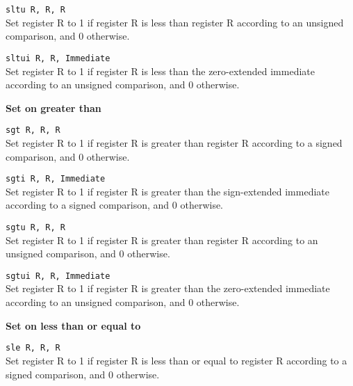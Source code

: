 \documentclass[12pt]{report}
\newcommand\subscr[1]{\raisebox{-0.5ex}{\small #1}}
\newcommand\regs{R\subscr{s}}
\newcommand\regd{R\subscr{d}}
\newcommand\regt{R\subscr{t}}
\begin{document}
\texttt{sltu \regd, \regs, \regt}\\
Set register \regd{} to 1 if register \regs{} is
less than register \regt{} according to an unsigned comparison, and 0 otherwise.
\vspace{1ex}

\newpage
\texttt{sltui \regd, \regs, Immediate}\\
Set register \regd{} to 1 if register \regs{} is
less than the zero-extended immediate according to an unsigned comparison, and 0 otherwise.
\vspace{1ex}

\noindent
{\bf Set on greater than}

\texttt{sgt \regd, \regs, \regt}\\
Set register \regd{} to 1 if register \regs{} is
greater than register \regt{} according to a signed comparison, and 0 otherwise.
\vspace{1ex}

\texttt{sgti \regd, \regs, Immediate}\\
Set register \regd{} to 1 if register \regs{} is
greater than the sign-extended immediate according to a signed comparison, and 0 otherwise.
\vspace{1ex}

\texttt{sgtu \regd, \regs, \regt}\\
Set register \regd{} to 1 if register \regs{} is
greater than register \regt{} according to an unsigned comparison, and 0 otherwise.
\vspace{1ex}

\texttt{sgtui \regd, \regs, Immediate}\\
Set register \regd{} to 1 if register \regs{} is
greater than the zero-extended immediate according to an unsigned comparison, and 0 otherwise.
\vspace{1ex}

\noindent
{\bf Set on less than or equal to}

\texttt{sle \regd, \regs, \regt}\\
Set register \regd{} to 1 if register \regs{} is
less than or equal to register \regt{} according to a signed comparison, and 0 otherwise.
\vspace{1ex}
\end{document}
